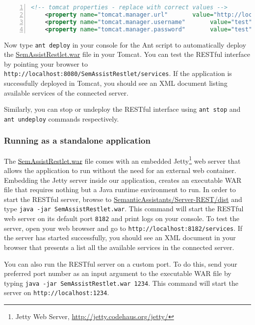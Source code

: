 \begin{lstlisting}[language=XML,numbers=left,xleftmargin=8mm,columns=flexible]
    <!-- tomcat properties - replace with correct values -->
    <property name="tomcat.manager.url"       value="http://localhost:8080/manager"/>
    <property name="tomcat.manager.username"       value="test"/>
    <property name="tomcat.manager.password"       value="test"/>
\end{lstlisting}

Now type \texttt{ant deploy} in your console for the Ant script to automatically deploy the \url{SemAssistRestlet.war} file in your Tomcat. You can test the RESTful interface by pointing your browser to \texttt{http://localhost:8080/SemAssistRestlet/services}. If the application is successfully deployed in Tomcat, you should see an XML document listing available services of the connected \sa server.

Similarly, you can stop or undeploy the RESTful interface using \texttt{ant stop} and \texttt{ant undeploy} commands respectively.
 
\subsubsection{Running as a standalone application}
The \url{SemAssistRestlet.war} file comes with an embedded Jetty\footnote{Jetty Web Server, \url{http://jetty.codehaus.org/jetty/}} web server that allows the application to run without the need for an external web container. Embedding the Jetty server inside our application, creates an executable WAR file that requires nothing but a Java runtime environment to run. In order to start the RESTful server, browse to \url{SemanticAssistants/Server-REST/dist} and type \texttt{java -jar SemAssistRestlet.war}. This command will start the RESTful web server on its default port \texttt{8182} and print logs on your console. To test the server, open your web browser and go to \texttt{http://localhost:8182/services}. If the server has started successfully, you should see an XML document in your browser that presents a list all the available services in the connected \sa server.

You can also run the RESTful server on a custom port. To do this, send your preferred port number as an input argument to the executable WAR file by typing \texttt{java -jar SemAssistRestlet.war 1234}. This command will start the server on \texttt{http://localhost:1234}.

